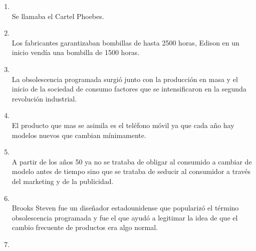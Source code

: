 \documentclass[spanish,openany]{report}
\begin{document}
\clearpage
\begin{enumerate}%
        \item{}\\
            Se llamaba el Cartel Phoebes. 
        \item{}\\
            Los fabricantes garantizaban bombillas de hasta 2500 horas, Edison en un inicio vendía una bombilla de 1500 horas.
        \item{}\\
            La obsolescencia programada surgió junto con la producción en masa y el inicio de la sociedad de consumo
            factores que se intensificaron en la segunda revolución industrial.
        \item{}\\
            El producto que mas se asimila es el teléfono móvil ya que cada año hay modelos nuevos que cambian mínimamente.
        \item{}\\
            A partir de los años 50 ya no se trataba de obligar al consumido a cambiar de modelo antes de tiempo sino que se trataba
            de seducir al consumidor a través del marketing y de la publicidad.
        \item{}\\
            Brooks Steven fue un diseñador estadounidense que popularizó el término obsolescencia programada
            y fue el que ayudó a legitimar la idea de que el cambio frecuente de productos era algo normal.
        \item{}\\

\end{enumerate}
\end{document}
